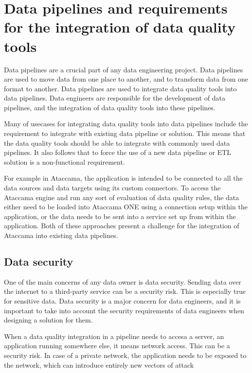 \section{Data pipelines and requirements for the integration of data quality tools}

Data pipelines are a crucial part of any data engineering project. Data pipelines are used to move data from one place to another, and to transform data from one format to another. Data pipelines are used to integrate data quality tools into data pipelines. Data engineers are responsible for the development of data pipelines, and the integration of data quality tools into these pipelines.

Many of usecases for integrating data quality tools into data pipelines include the requirement to integrate with existing data pipeline or solution. This means that the data quality tools should be able to integrate with commonly used data pipelines. It also follows that to force the use of a new data pipeline or ETL solution is a non-functional requirement. 

For example in Ataccama, the application is intended to be connected to all the data sources and data targets using its custom connectors. To access the Ataccama engine and run any sort of evaluation of data quality rules, the data either need to be loaded into Ataccama ONE using a connection setup within the application, or the data needs to be sent into a service set up from within the application. Both of these approaches present a challenge for the integration of Ataccama into existing data pipelines.

\subsection{Data security}

One of the main concerns of any data owner is data security. Sending data over the internet to a third-party service can be a security risk. This is especially true for sensitive data. Data security is a major concern for data engineers, and it is important to take into account the security requirements of data engineers when designing a solution for them.

When a data quality integration in a pipeline needs to accesa a server, an application running somewhere else, it means network access. This can be a security risk. In case of a private network, the application needs to be exposed to the network, which can introduce entirely new vectors of attack

